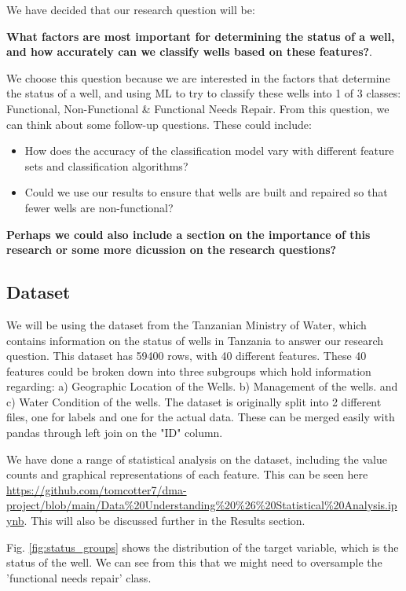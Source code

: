 \documentclass[conference]{IEEEtran}
\begin{document}
We have decided that our research question will be: 

\textbf{What factors are most important for determining the status of a well, and how accurately can we classify wells based on these features?}. 

We choose this question because we are interested in the factors that determine the status of a well, and using ML to try to classify these wells into 1 of 3 classes: Functional, Non-Functional \& Functional Needs Repair. From this question, we can think about some follow-up questions. These could include:
    \begin{itemize}
        \item How does the accuracy of the classification model vary with different feature sets and classification algorithms?
        \item Could we use our results to ensure that wells are built and repaired so that fewer wells are non-functional?
    \end{itemize}

\textbf{Perhaps we could also include a section on the importance of this research or some more dicussion on the research questions?}

\subsection{Dataset}

We will be using the dataset from the Tanzanian Ministry of Water, which contains information on the status of wells in Tanzania to answer our research question. This dataset has 59400 rows, with 40 different features. These 40 features could be broken down into three subgroups which hold information regarding: a) Geographic Location of the Wells. b) Management of the wells. and c) Water Condition of the wells. The dataset is originally split into 2 different files, one for labels and one for the actual data. These can be merged easily with pandas through left join on the "ID" column. 


We have done a range of statistical analysis on the dataset, including the value counts and graphical representations of each feature. This can be seen here \url{https://github.com/tomcotter7/dma-project/blob/main/Data%20Understanding%20%26%20Statistical%20Analysis.ipynb}. This will also be discussed further in the Results section.

Fig. \ref{fig:status_groups} shows the distribution of the target variable, which is the status of the well. We can see from this that we might need to oversample the 'functional needs repair' class.
\end{document}
